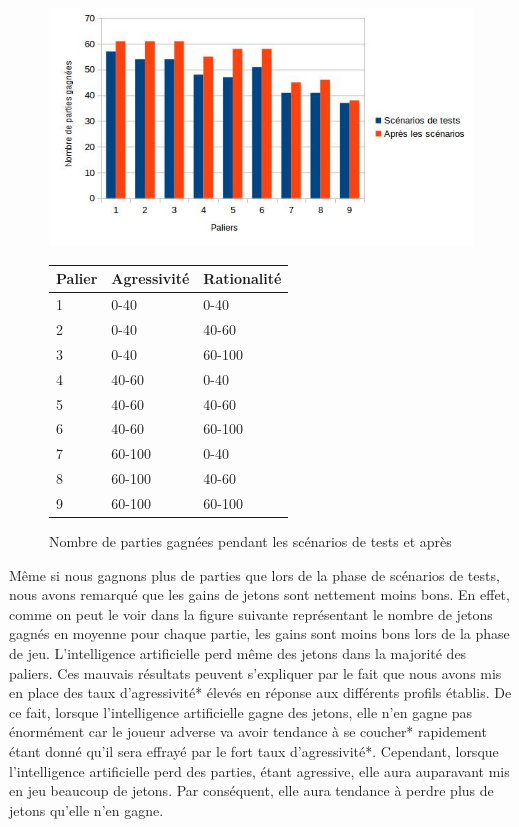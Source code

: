 \documentclass{report}
\begin{document}
\begin{figure}[H]
	\begin{center}
		\includegraphics[scale=0.5]{./imagesRapport/PremierCalibrageComparaisonNombrePartiesGagnees.jpg}
		
		\hspace{-1.5cm}\begin{tabular}{|l|l|l|}
			\hline
			Palier & 	Agressivité &	Rationalité\\
			\hline
			 1 & 0-40 & 0-40\\
			\hline
			 2 & 	0-40 & 40-60\\
			\hline
			 3 & 0-40 & 60-100\\
			\hline
			 4 & 	40-60 & 0-40\\
			\hline
			 5 & 40-60 & 40-60\\
			\hline
			 6 & 40-60 & 60-100\\
			\hline
			 7 & 60-100 & 0-40\\
			\hline
			 8 & 60-100 & 40-60\\
			\hline
			 9 & 60-100 & 60-100\\
			\hline
		\end{tabular}
		
	\end{center}
	\caption{Nombre de parties gagnées pendant les scénarios de tests et après}
\end{figure}


Même si nous gagnons plus de parties que lors de la phase de scénarios de tests, nous avons remarqué que les gains de jetons sont nettement moins bons. En effet, comme on peut le voir dans la figure suivante représentant le nombre de jetons gagnés en moyenne pour chaque partie, les gains sont moins bons lors de la phase de jeu. L'intelligence artificielle perd même des jetons dans la majorité des paliers. Ces mauvais résultats peuvent s'expliquer par le fait que nous avons mis en place des taux d'agressivité* élevés en réponse aux différents profils établis. De ce fait, lorsque l'intelligence artificielle gagne des jetons, elle n'en gagne pas énormément car le joueur adverse va avoir tendance à se coucher* rapidement étant donné qu'il sera effrayé par le fort taux d'agressivité*. Cependant, lorsque l'intelligence artificielle perd des parties, étant agressive, elle aura auparavant mis en jeu beaucoup de jetons. Par conséquent, elle aura tendance à perdre plus de jetons qu'elle n'en gagne.\par
\end{document}
